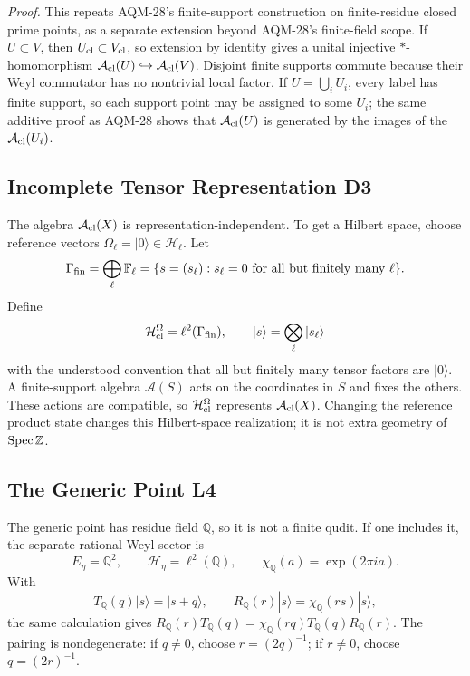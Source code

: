 \emph{Proof.}
This repeats AQM-28's finite-support construction on finite-residue closed
prime points, as a separate extension beyond AQM-28's finite-field scope.  If
\(U\subset V\), then \(U_{\rm cl}\subset V_{\rm cl}\), so extension by identity
gives a unital injective \(*\)-homomorphism
\(\mathcal A_{\rm cl}(U)\hookrightarrow\mathcal A_{\rm cl}(V)\).  Disjoint
finite supports commute because their Weyl commutator has no nontrivial local
factor.  If \(U=\bigcup_iU_i\), every label has finite support, so each support
point may be assigned to some \(U_i\); the same additive proof as AQM-28 shows
that \(\mathcal A_{\rm cl}(U)\) is generated by the images of the
\(\mathcal A_{\rm cl}(U_i)\).

\subsection{Incomplete Tensor Representation D3}
The algebra \(\mathcal A_{\rm cl}(X)\) is representation-independent.  To get a
Hilbert space, choose reference vectors
\(\Omega_\ell=|0\rangle\in\mathcal H_\ell\).  Let
\[
  \Gamma_{\rm fin}=\bigoplus_\ell\mathbb F_\ell
  =
  \{s=(s_\ell):s_\ell=0\text{ for all but finitely many }\ell\}.
\]
Define
\[
  \mathcal H^\Omega_{\rm cl}=\ell^2(\Gamma_{\rm fin}),
  \qquad |s\rangle=\bigotimes_\ell |s_\ell\rangle
\]
with the understood convention that all but finitely many tensor factors are
\(|0\rangle\).  A finite-support algebra \(\mathcal A(S)\) acts on the
coordinates in \(S\) and fixes the others.  These actions are compatible, so
\(\mathcal H^\Omega_{\rm cl}\) represents \(\mathcal A_{\rm cl}(X)\).
Changing the reference product state changes this Hilbert-space realization;
it is not extra geometry of \(\operatorname{Spec}\mathbb Z\).

\subsection{The Generic Point L4}
The generic point has residue field \(\mathbb Q\), so it is not a finite qudit.
If one includes it, the separate rational Weyl sector is
\[
  E_\eta=\mathbb Q^2,\qquad \mathcal H_\eta=\ell^2(\mathbb Q),
  \qquad \chi_\mathbb Q(a)=\exp(2\pi i a).
\]
With
\[
  T_\mathbb Q(q)|s\rangle=|s+q\rangle,\qquad
  R_\mathbb Q(r)|s\rangle=\chi_\mathbb Q(rs)|s\rangle,
\]
the same calculation gives \(R_\mathbb Q(r)T_\mathbb Q(q)
=\chi_\mathbb Q(rq)T_\mathbb Q(q)R_\mathbb Q(r)\).  The pairing is
nondegenerate: if \(q\ne0\), choose \(r=(2q)^{-1}\); if \(r\ne0\), choose
\(q=(2r)^{-1}\).

